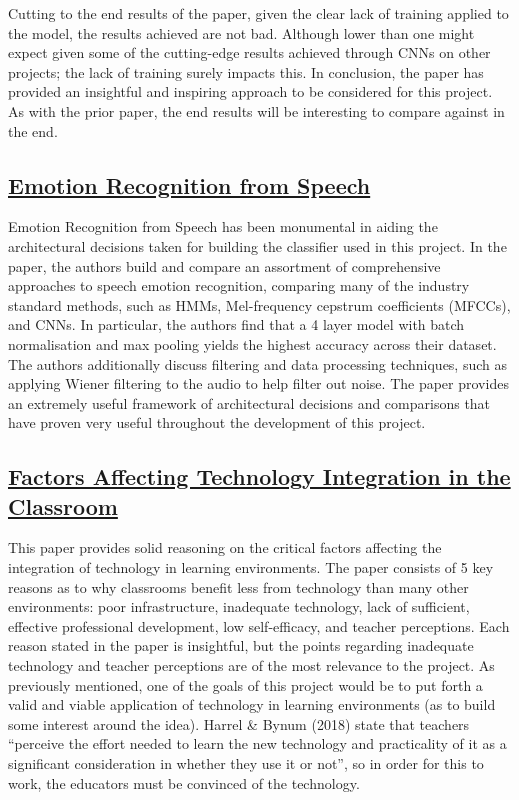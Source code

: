 \documentclass[12pt]{article}
\begin{document}
\noindent Cutting to the end results of the paper, given the clear lack of training applied to the model, the results achieved are not bad. Although lower than one might expect given some of the cutting-edge results achieved through CNNs on other projects; the lack of training surely impacts this. In conclusion, the paper has provided an insightful and inspiring approach to be considered for this project. As with the prior paper, the end results will be interesting to compare against in the end.

\subsection{\href{https://arxiv.org/pdf/1912.10458.pdf}{Emotion Recognition from Speech}}
Emotion Recognition from Speech has been monumental in aiding the architectural decisions taken for building the classifier used in this project. In the paper, the authors build and compare an assortment of comprehensive approaches to speech emotion recognition, comparing many of the industry standard methods, such as HMMs, Mel-frequency cepstrum coefficients (MFCCs), and CNNs. In particular, the authors find that a 4 layer model with batch normalisation and max pooling yields the highest accuracy across their dataset. The authors additionally discuss filtering and data processing techniques, such as applying Wiener filtering to the audio to help filter out noise. The paper provides an extremely useful framework of architectural decisions and comparisons that have proven very useful throughout the development of this project. 

\subsection{\href{https://files.eric.ed.gov/fulltext/EJ1194723.pdf}{Factors Affecting Technology Integration in the Classroom}}
This paper provides solid reasoning on the critical factors affecting the integration of technology in learning environments. The paper consists of 5 key reasons as to why classrooms benefit less from technology than many other environments: poor infrastructure, inadequate technology, lack of sufficient, effective professional development, low self-efficacy, and teacher perceptions. Each reason stated in the paper is insightful, but the points regarding inadequate technology and teacher perceptions are of the most relevance to the project. As previously mentioned, one of the goals of this project would be to put forth a valid and viable application of technology in learning environments (as to build some interest around the idea). Harrel \& Bynum (2018) state that teachers ``perceive the effort needed to learn the new technology and practicality of it as a significant consideration in whether they use it or not'', so in order for this to work, the educators must be convinced of the technology.
\end{document}
